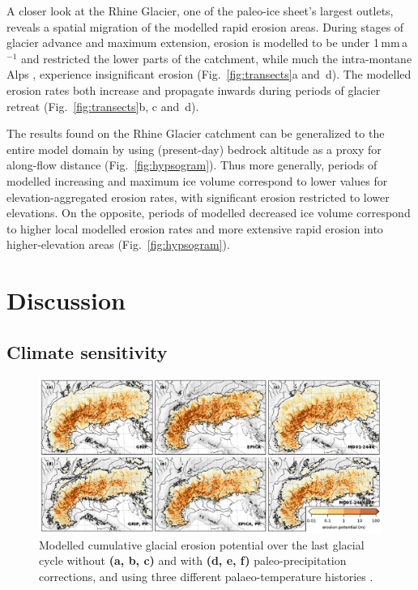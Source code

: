\documentclass[esurf, manuscript]{copernicus}
\begin{document}
    A closer look at the Rhine Glacier, one of the paleo-ice sheet's largest
    outlets, reveals a spatial migration of the modelled rapid erosion areas.
    During stages of glacier advance and maximum extension, erosion is modelled
    to be under 1\,mm\,a$^{-1}$ and restricted the lower parts of the
    catchment, while much the intra-montane Alps \citep[modelled to be largely
    cold-based, Fig.~6c in][]{Seguinot.etal.2018}, experience
    insignificant erosion (Fig.~\ref{fig:transects}a and~d). The modelled
    erosion rates both increase and propagate inwards during periods of glacier
    retreat (Fig.~\ref{fig:transects}b, c and~d).

    The results found on the Rhine Glacier catchment can be generalized to the
    entire model domain by using (present-day) bedrock altitude as a proxy for
    along-flow distance (Fig.~\ref{fig:hypsogram}). Thus more generally,
    periods of modelled increasing and maximum ice volume correspond to lower
    values for elevation-aggregated erosion rates, with significant erosion
    restricted to lower elevations. On the opposite, periods of modelled
    decreased ice volume correspond to higher local modelled erosion rates and
    more extensive rapid erosion into higher-elevation areas
    (Fig.~\ref{fig:hypsogram}).


\section{Discussion}

\subsection{Climate sensitivity}
\label{sec:sensitivity}

    \begin{figure}[ht]
      \centerline{\includegraphics{alpero_sensitivity}}
      \caption{%
        Modelled cumulative glacial erosion potential over the last glacial
        cycle without \textbf{(a, b, c)} and with \textbf{(d, e, f)}
        paleo-precipitation corrections, and using three different
        palaeo-temperature histories \citep[see][]{Seguinot.etal.2018}.}
      \label{fig:sensitivity}
    \end{figure}
\end{document}
